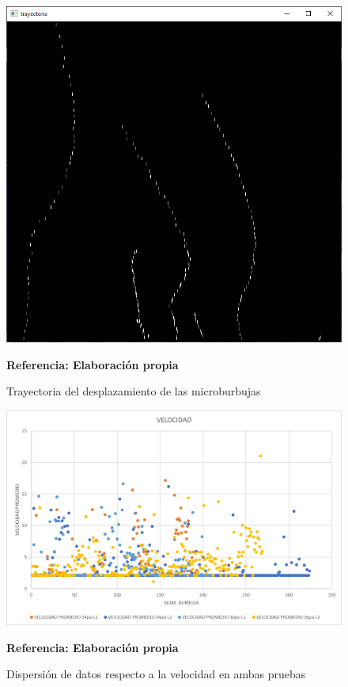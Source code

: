 \documentclass[12pt,twocolumn,a4paper]{article}
\begin{document}
\begin{figure}[h!]
	\centering
	\includegraphics[scale=0.4]{trayectoria.png}
	\caption{Trayectoria del desplazamiento de las microburbujas } \textbf{Referencia: Elaboración propia} 
	\label{trayectoria}
\end{figure}

\begin{figure}[h!]

	\centering
	\includegraphics[scale=0.35]{Dispvel.png}
	\caption{Dispersión de datos respecto a la velocidad en ambas pruebas } \textbf{Referencia: Elaboración propia} 
	\label{dispvel}
\end{figure}
\end{document}
